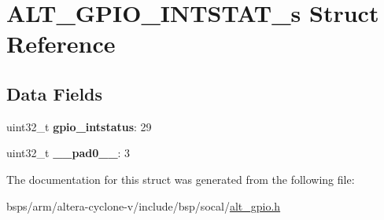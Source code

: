 \hypertarget{structALT__GPIO__INTSTAT__s}{}\section{A\+L\+T\+\_\+\+G\+P\+I\+O\+\_\+\+I\+N\+T\+S\+T\+A\+T\+\_\+s Struct Reference}
\label{structALT__GPIO__INTSTAT__s}
\subsection*{Data Fields}
\begin{DoxyCompactItemize}
\item 
\mbox{\label{structALT__GPIO__INTSTAT__s_a9b168a2a99460fba4d9b76f780b21e07}} 
uint32\+\_\+t {\bfseries gpio\+\_\+intstatus}\+: 29
\item 
\mbox{\label{structALT__GPIO__INTSTAT__s_a62a305a98e9b78b3280e13c82ffb4260}} 
uint32\+\_\+t {\bfseries \+\_\+\+\_\+pad0\+\_\+\+\_\+}\+: 3
\end{DoxyCompactItemize}


The documentation for this struct was generated from the following file\+:\begin{DoxyCompactItemize}
\item 
bsps/arm/altera-\/cyclone-\/v/include/bsp/socal/\mbox{\hyperlink{alt__gpio_8h}{alt\+\_\+gpio.\+h}}\end{DoxyCompactItemize}
